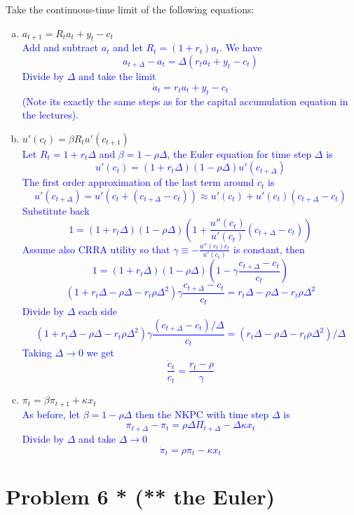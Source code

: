 \documentclass[11pt]{extarticle}
\theoremstyle{plain}
\theoremstyle{definition}
\begin{document}
Take the continuous-time limit of the following equations:
\begin{enumerate}[(a)]
\item $a_{t+1} = R_t a_t + y_t - c_t$ \\

\textcolor{blue}{Add and subtract $a_t$ and let $R_t = (1+r_t)a_t$. We have $$a_{t+\Delta}-a_t= \Delta (r_t a_t+y_t-c_t)$$
Divide by $\Delta$ and take the limit $$\dot a_t = r_t a_t + y_t - c_t$$ (Note its exactly the same steps as for the capital accumulation equation in the lectures).}

\item $u'(c_t) = \beta R_t u'(c_{t+1})$ \\

\textcolor{blue}{Let $R_t=1+r_t \Delta$ and $\beta = 1-\rho \Delta$, the Euler equation for time step $\Delta$ is $$u'(c_t)=(1+r_t \Delta )(1-\rho \Delta)u'(c_{t+\Delta})$$ The first order approximation of the last term around $c_t$ is $$u'(c_{t+\Delta})=u'(c_{t}+(c_{t+\Delta}-c_t))\approx u'(c_t)+u'(c_t)(c_{t+\Delta}-c_t)$$ Substitute back $$1=(1+r_t \Delta )(1-\rho \Delta)(1+\frac{u''(c_t)}{u'(c_t)}(c_{t+\Delta}-c_t))$$ Assume also CRRA utility so that $\gamma \equiv -\frac{u''(c_t)c_t}{u'(c_t)}$ is constant, then  $$1=(1+r_t \Delta )(1-\rho \Delta)(1-\gamma \frac{c_{t+\Delta}-c_t}{c_t})$$ $$(1+r_t \Delta-\rho \Delta - r_t \rho \Delta^2)\gamma \frac{c_{t+\Delta}-c_t}{c_t}=r_t \Delta-\rho \Delta - r_t \rho \Delta^2$$ Divide by $\Delta$ each side $$(1+r_t \Delta-\rho \Delta -r_t \rho \Delta^2)\gamma \frac{(c_{t+\Delta}-c_t)/\Delta}{c_t}=(r_t \Delta-\rho \Delta - r_t \rho \Delta^2)/\Delta$$ Taking $\Delta \rightarrow 0$ we get $$\frac{\dot c_t}{c_t} = \frac{r_t - \rho}{\gamma}$$}

\item $\pi_t = \beta \pi_{t+1} + \kappa x_t$ \\

\textcolor{blue}{As before, let $\beta = 1-\rho \Delta$ then the NKPC with time step $\Delta$ is $$\pi_{t+\Delta}-\pi_t = \rho \Delta \Pi_{t+\Delta}-\Delta \kappa x_t$$ Divide by $\Delta$ and take $\Delta \rightarrow 0$ $$\dot{\pi}_t = \rho \pi_t - \kappa x_t$$}
\end{enumerate}


\vspace{10mm}
\section*{Problem 6  * (** the Euler)}
\end{document}
